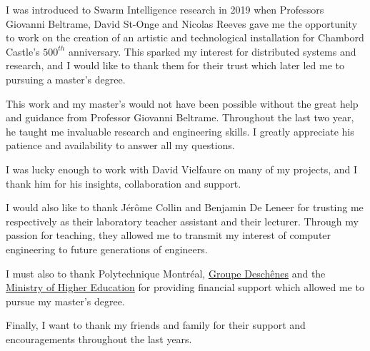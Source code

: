%
I was introduced to Swarm Intelligence research in 2019 when Professors Giovanni Beltrame, David St-Onge and Nicolas Reeves gave me the opportunity to work on the creation of an artistic and technological installation for Chambord Castle's $500^{th}$ anniversary. This sparked my interest for distributed systems and research, and I would like to thank them for their trust which later led me to pursuing a master's degree.

This work and my master's would not have been possible without the great help and guidance from Professor Giovanni Beltrame. Throughout the last two year, he taught me invaluable research and engineering skills. I greatly appreciate his patience and availability to answer all my questions.  

I was lucky enough to work with David Vielfaure on many of my projects, and I thank him for his insights, collaboration and support.

I would also like to thank Jérôme Collin and Benjamin De Leneer for trusting me respectively as their laboratory teacher assistant and their lecturer. Through my passion for teaching, they allowed me to transmit my interest of computer engineering to future generations of engineers.

I must also to thank Polytechnique Montréal, \href{https://www.groupedeschenes.com}{Groupe Deschênes} and the \href{https://www.quebec.ca/en/government/ministere/enseignement-superieur}{Ministry of Higher Education} for providing financial support which allowed me to pursue my master's degree. 

Finally, I want to thank my friends and family for their support and encouragements throughout the last years.
